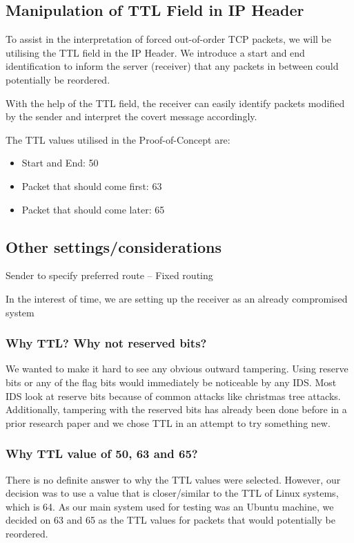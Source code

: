 \documentclass[letterpaper,twocolumn,10pt]{article}
\begin{document}
\subsection{Manipulation of TTL Field in IP Header}

To assist in the interpretation of forced out-of-order TCP packets, we will be utilising the TTL field in the IP Header. We introduce a start and end identification to inform the server (receiver) that any packets in between could potentially be reordered.

With the help of the TTL field, the receiver can easily identify packets modified by the sender and interpret the covert message accordingly.

The TTL values utilised in the Proof-of-Concept are:

\begin{itemize}
  \item Start and End: 50
  \item Packet that should come first: 63
  \item Packet that should come later: 65
\end{itemize}

\subsection{Other settings/considerations}
\begin{compactitem}
  \item Sender to specify preferred route – Fixed routing
  \item In the interest of time, we are setting up the receiver as an already compromised system
\end{compactitem}

\subsubsection{Why TTL? Why not reserved bits?}
We wanted to make it hard to see any obvious outward tampering. Using reserve bits or any of the flag bits would immediately be noticeable by any IDS. Most IDS look at reserve bits because of common attacks like christmas tree attacks. Additionally, tampering with the reserved bits has already been done before in a prior research paper and we chose TTL in an attempt to try something new.

\subsubsection{Why TTL value of 50, 63 and 65?}
There is no definite answer to why the TTL values were selected. However, our decision was to use a value that is closer/similar to the TTL of Linux systems, which is 64. As our main system used for testing was an Ubuntu machine, we decided on 63 and 65 as the TTL values for packets that would potentially be reordered.
\end{document}
